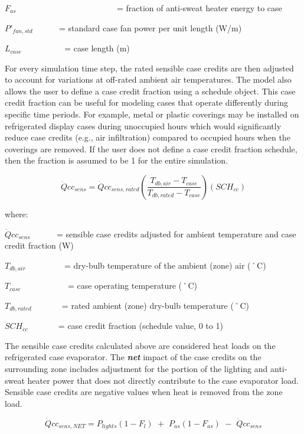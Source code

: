 \({F_{as}}\) ~~~~~~~~~~~~~~~~~~~~~~~ = fraction of anti-sweat heater energy to case

\({P'}_{fan,std}\) ~~~~~ = standard case fan power per unit length (W/m)

\({L_{case}}\) ~~~~~~~~~ = case length (m)

For every simulation time step, the rated sensible case credits are then adjusted to account for variations at off-rated ambient air temperatures. The model also allows the user to define a case credit fraction using a schedule object. This case credit fraction can be useful for modeling cases that operate differently during specific time periods. For example, metal or plastic coverings may be installed on refrigerated display cases during unoccupied hours which would significantly reduce case credits (e.g., air infiltration) compared to occupied hours when the coverings are removed. If the user does not define a case credit fraction schedule, then the fraction is assumed to be 1 for the entire simulation.

\begin{equation}
\dot Qc{c_{sens}} = \dot Qc{c_{sens,rated}}\left( {\frac{{{T_{db,air}} - {T_{case}}}}{{{T_{db,rated}} - {T_{case}}}}} \right)\left( {SC{H_{cc}}} \right)
\end{equation}

where:

\(\dot Qc{c_{sens}}\) ~~~~~ = sensible case credits adjusted for ambient temperature and case credit fraction (W)

\({T_{db,air}}\) ~~~~~~~~ = dry-bulb temperature of the ambient (zone) air (˚C)

\({T_{case}}\) ~~~~~~~~~~ = case operating temperature (˚C)

\({T_{db,rated}}\) ~~~~~~ = rated ambient (zone) dry-bulb temperature (˚C)

\(SC{H_{cc}}\) ~~~~~~ = case credit fraction (schedule value, 0 to 1)

The sensible case credits calculated above are considered heat loads on the refrigerated case evaporator. The \textbf{\emph{net}} impact of the case credits on the surrounding zone includes adjustment for the portion of the lighting and anti-sweat heater power that does not directly contribute to the case evaporator load. Sensible case credits are negative values when heat is removed from the zone load.

\begin{equation}
\dot Qc{c_{sens,NET}} = {P_{lights}}(1 - {F_l})\,\, + \,\,{P_{as}}(1 - {F_{as}})\,\, - \,\,\dot Qc{c_{sens}}
\end{equation}

